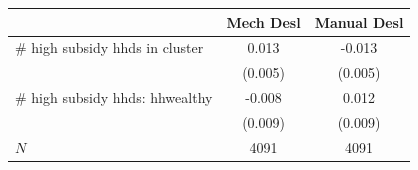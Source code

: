 \begin{tabular}{lcc}
\hline\hline
 & Mech Desl & Manual Desl \\
\hline
# high subsidy hhds in cluster & 0.013 & -0.013 \\
 & (0.005) & (0.005) \\
# high subsidy hhds: hhwealthy & -0.008 & 0.012 \\
 & (0.009) & (0.009) \\
\hline
$N$ & 4091 & 4091 \\
\hline\hline
\end{tabular}
